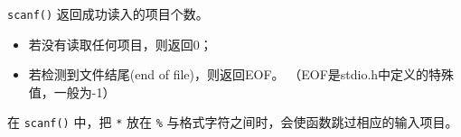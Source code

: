 \begin{frame}[fragile]
  \lstinline|scanf()| 返回成功读入的项目个数。

\begin{itemize}
\item
 若没有读取任何项目，则返回0；
\item
若检测到文件结尾(end of file)，则返回EOF。
（EOF是stdio.h中定义的特殊值，一般为-1）
\end{itemize}

\end{frame}

% 


\begin{frame}[fragile]
 在 \lstinline|scanf()| 中，把 \lstinline|*| 放在 \lstinline|%| 与格式字符之间时，会使函数跳过相应的输入项目。
\end{frame}


% 







